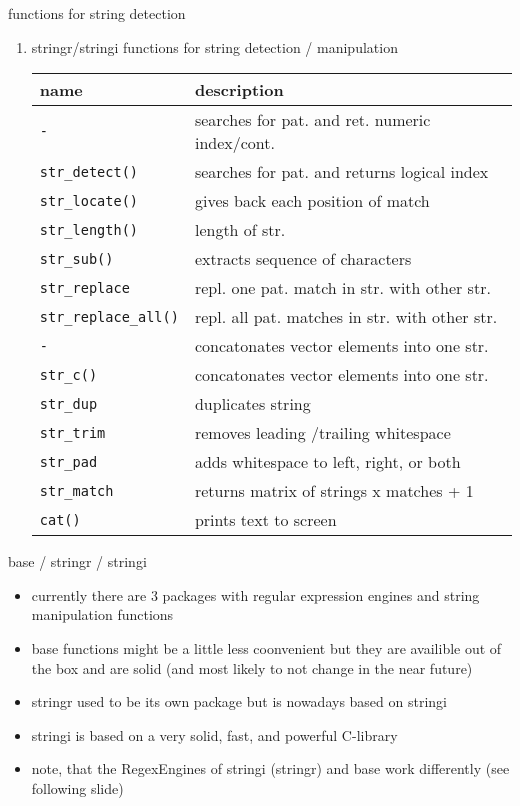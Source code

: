 \documentclass[ignorenonframetext,]{beamer}
\providecommand{\tightlist}{%
  \setlength{\itemsep}{0pt}\setlength{\parskip}{0pt}}
\begin{document}
\begin{frame}[fragile]{functions for string detection}

\begin{enumerate}
\def\labelenumi{\arabic{enumi})}
\setcounter{enumi}{5}
\item
  stringr/stringi functions for string detection / manipulation

  \begin{longtable}[c]{@{}ll@{}}
  \toprule
  name & description\tabularnewline
  \midrule
  \endhead
  \texttt{-} & searches for pat. and ret. numeric
  index/cont.\tabularnewline
  \texttt{str\_detect()} & searches for pat. and returns logical
  index\tabularnewline
  \texttt{str\_locate()} & gives back each position of
  match\tabularnewline
  \texttt{str\_length()} & length of str.\tabularnewline
  \texttt{str\_sub()} & extracts sequence of characters\tabularnewline
  \texttt{str\_replace} & repl. one pat. match in str. with other
  str.\tabularnewline
  \texttt{str\_replace\_all()} & repl. all pat. matches in str. with
  other str.\tabularnewline
  \texttt{-} & concatonates vector elements into one str.\tabularnewline
  \texttt{str\_c()} & concatonates vector elements into one
  str.\tabularnewline
  \texttt{str\_dup} & duplicates string\tabularnewline
  \texttt{str\_trim} & removes leading /trailing
  whitespace\tabularnewline
  \texttt{str\_pad} & adds whitespace to left, right, or
  both\tabularnewline
  \texttt{str\_match} & returns matrix of strings x matches +
  1\tabularnewline
  \texttt{cat()} & prints text to screen\tabularnewline
  \bottomrule
  \end{longtable}
\end{enumerate}

\end{frame}

\begin{frame}{base / stringr / stringi}

\begin{itemize}
\tightlist
\item
  currently there are 3 packages with regular expression engines and
  string manipulation functions
\item
  base functions might be a little less coonvenient but they are
  availible out of the box and are solid (and most likely to not change
  in the near future)
\item
  stringr used to be its own package but is nowadays based on stringi
\item
  stringi is based on a very solid, fast, and powerful C-library
\item
  note, that the RegexEngines of stringi (stringr) and base work
  differently (see following slide)
\end{itemize}

\end{frame}
\end{document}
